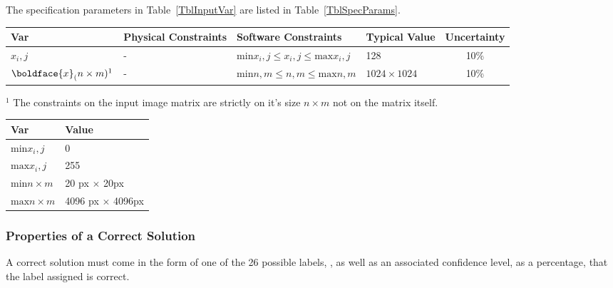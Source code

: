 \documentclass[12pt]{article}
\begin{document}
The specification parameters in Table~\ref{TblInputVar} are listed in
Table~\ref{TblSpecParams}.

\begin{table}[!h]
  \caption{Input Variables} \label{TblInputVar}
  \renewcommand{\arraystretch}{1.2}
\noindent \begin{longtable*}{l l l l c} 
  \toprule
  \textbf{Var} & \textbf{Physical Constraints} & \textbf{Software Constraints} &
                             \textbf{Typical Value} & \textbf{Uncertainty}\\
  \midrule 
  $x_i,j$& - & ${\text{min}} x_i,j \leq x_i,j \leq {\text{max}} x_i,j$ & 128 & 10\%
  \\
  $\boldface{x}_(n \times m)^1$& - & ${\text{min}} n, m \leq n, m \leq {\text{max}} n, m$ & $1024 \times 1024$ & 10\%
  \\
  \bottomrule
\end{longtable*}
\end{table}

\noindent 
\begin{description}
\item $^1$ The constraints on the input image matrix are strictly on it's size $n \times m$ not on the matrix itself.
\end{description}

\begin{table}[!h]
\caption{Specification Parameter Values} \label{TblSpecParams}
\renewcommand{\arraystretch}{1.2}
\noindent \begin{longtable*}{l l} 
  \toprule
  \textbf{Var} & \textbf{Value} \\
  \midrule 
  $\text{min} x_i,j$ & 0\\
  $\text{max} x_i,j$ & 255\\
  $\text{min} n \times m$ & 20 px $\times$ 20px\\
  $\text{max} n \times m$ & 4096 px $\times$ 4096px\\
  \bottomrule
\end{longtable*}
\end{table}

\subsubsection{Properties of a Correct Solution} \label{sec_CorrectSolution}

\noindent
A correct solution must come in the form of one of the 26 possible labels,
, as well as an associated 
confidence level, as a percentage, that the label assigned is correct.
\end{document}
